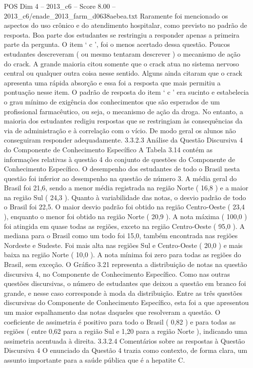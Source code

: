 \begin{textsample}{POS Dim 4 – 2013\_c6 – Score 8.00 – 2013\_c6/enade\_2013\_farm\_d0638aebea.txt}
Raramente foi mencionado os aspectos do uso crônico e do atendimento hospitalar, como previsto no padrão de resposta.
Boa parte dos estudantes se restringiu a responder apenas a primeira parte da pergunta.
O item ‘ c ’, foi o menos acertado dessa questão.
Poucos estudantes descreveram ( ou mesmo tentaram descrever ) o mecanismo de ação do crack.
A grande maioria citou somente que o crack atua no sistema nervoso central ou qualquer outra coisa nesse sentido.
Alguns ainda citaram que o crack apresenta uma rápida absorção e essa foi a resposta que mais permitiu a pontuação nesse item.
O padrão de resposta do item ‘ c ’ era sucinto e estabelecia o grau mínimo de exigência dos conhecimentos que são esperados de um profissional farmacêutico, ou seja, o mecanismo de ação da droga.
No entanto, a maioria dos estudantes redigiu respostas que se restringiam às consequências da via de administração e à correlação com o vício.
De modo geral os alunos não conseguiram responder adequadamente. 3.3.2.3 Análise da Questão Discursiva 4 do Componente de Conhecimento Específico A Tabela 3.14 contém as informações relativas à questão 4 do conjunto de questões do Componente de Conhecimento Específico.
O desempenho dos estudantes de todo o Brasil nesta questão foi inferior ao desempenho na questão de número 3.
A média geral do Brasil foi 21,6, sendo a menor média registrada na região Norte ( 16,8 ) e a maior na região Sul ( 24,3 ).
Quanto à variabilidade das notas, o desvio padrão de todo o Brasil foi 22,5.
O maior desvio padrão foi obtido na região Centro-Oeste ( 23,4 ), enquanto o menor foi obtido na região Norte ( 20,9 ).
A nota máxima ( 100,0 ) foi atingida em quase todas as regiões, exceto na região Centro-Oeste ( 95,0 ).
A mediana para o Brasil como um todo foi 15,0, também encontrada nas regiões Nordeste e Sudeste.
Foi mais alta nas regiões Sul e Centro-Oeste ( 20,0 ) e mais baixa na região Norte ( 10,0 ).
A nota mínima foi zero para todas as regiões do Brasil, sem exceção.
O Gráfico 3.21 representa a distribuição de notas na questão discursiva 4, no Componente de Conhecimento Específico.
Como nas outras questões discursivas, o número de estudantes que deixou a questão em branco foi grande, e nesse caso corresponde à moda da distribuição.
Entre as três questões discursivas do Componente de Conhecimento Específico, esta foi a que apresentou um maior espalhamento das notas daqueles que resolveram a questão.
O coeficiente de assimetria é positivo para todo o Brasil ( 0,82 ) e para todas as regiões ( entre 0,62 para a região Sul e 1,20 para a região Norte ), indicando uma assimetria acentuada à direita. 3.3.2.4 Comentários sobre as respostas à Questão Discursiva 4 O enunciado da Questão 4 trazia como contexto, de forma clara, um assunto importante para a saúde pública que é a hepatite C.

\end{textsample}
